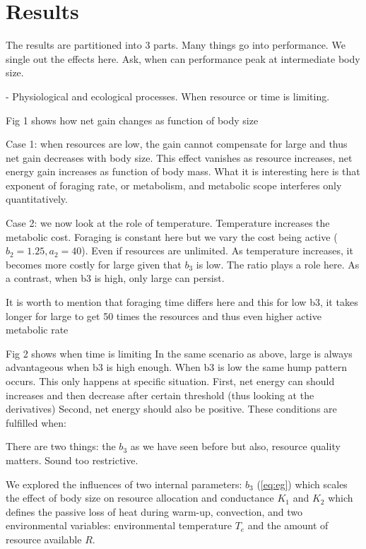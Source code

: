 \section*{Results}
The results are partitioned into 3 parts.
Many things go into performance. We  single out the effects here.
 Ask, when can performance peak at intermediate body size.

- Physiological and ecological processes.
When resource or time is limiting.

Fig 1 shows how net gain changes as function of body size

 Case 1: when resources are low, the gain cannot compensate for large and thus net gain decreases with body size. 
 This effect vanishes as resource increases, net energy gain increases as function of body mass.
 What it is interesting here is that exponent of foraging rate, or metabolism, and metabolic scope interferes only quantitatively. 
 
 Case 2: we now look at the role of temperature.
 Temperature increases the metabolic cost.
 Foraging is constant here but we vary the cost being active ($b_2 = 1.25, a_2 = 40$).
 Even if resources are unlimited.
 As temperature increases, it becomes more costly for large given that $b_3$ is low. 
 The ratio plays a role here.
 As a contrast, when b3 is high, only large can persist. 

 It is worth to mention that foraging time differs here and this for low b3, it takes longer for large to get 50 times the resources and thus even higher active metabolic rate   
 
 Fig 2 shows when time is limiting
 In the same scenario as above, large is always advantageous when b3 is high enough.
 When b3 is low the same hump pattern occurs.
This only happens at specific situation.
First, net energy can should increases and then decrease after certain threshold (thus looking at the derivatives)
Second, net energy should also be positive.
These conditions are fulfilled when: 

 There are two things: the $b_3$ as we have seen before but also, resource quality matters.
 Sound too restrictive. 
 

We explored the influences of two internal parameters: $b_3$ (\cref{eq:eg}) which scales the effect of body size on resource allocation and conductance $K_1$ and $K_2$ which defines the passive loss of heat during warm-up, convection, and two environmental variables: environmental temperature $T_e$ and the amount of resource available $R$.

